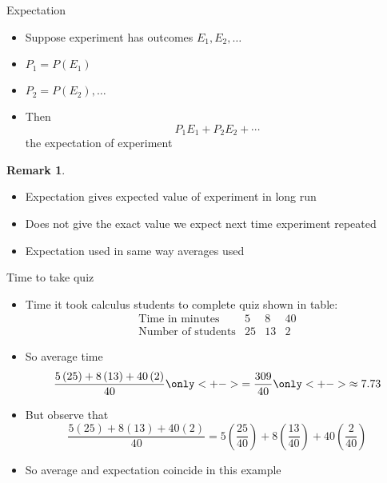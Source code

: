 \documentclass[handout]{beamer}
\theoremstyle{definition}
\newtheorem{remark}{Remark}
\begin{document}
\begin{frame}{Expectation}
\begin{definition}
\begin{itemize}
\item Suppose experiment has outcomes $E_1,E_2,\ldots$
\item $P_1=P\left(E_1\right)$
\item $P_2=P\left(E_2\right),\ldots$
\item Then
\[P_1E_1+P_2E_2+\cdots\]
the \alert{expectation} of experiment
\end{itemize}
\end{definition}
\begin{remark}
\begin{itemize}
\item Expectation gives
\alert{expected value} of experiment \alert{in long run}
\item Does not give the exact value we expect
next time experiment repeated
\item Expectation used in same way averages used
\end{itemize}
\end{remark}
\end{frame}

\begin{frame}{Time to take quiz}
\begin{itemize}
\item Time it took calculus students to complete quiz
shown in table:
\[\begin{array}{r|ccc}
\text{Time in minutes}&5&8&40\\\hline
\text{Number of students}&25&13&2
\end{array}\]
\item So average time
\[\frac{5\left(25\right)+8\left(13\right)+40\left(2\right)}{40}
\only<+->{=\frac{309}{40}}
\only<+->{\approx 7.73}\]
\item But observe that
\[\frac{5\left(25\right)+8\left(13\right)+40\left(2\right)}{40}
=5\left(\frac{25}{40}\right)+8\left(\frac{13}{40}\right)
+40\left(\frac{2}{40}\right)\]
\item So average and expectation coincide in this example
\end{itemize}
\end{frame}
\end{document}
